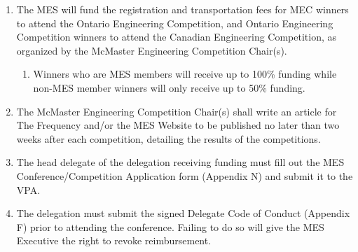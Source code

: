 \begin{enumerate}
  \begin{enumerate}
   \item
    The MES will fund the registration and transportation fees for MEC winners to attend the Ontario Engineering Competition, and Ontario Engineering Competition winners to attend the Canadian Engineering Competition, as organized by the McMaster Engineering Competition Chair(s).

    \begin{enumerate}
     \item
      Winners who are MES members will receive up to 100\% funding while non-MES member winners will only receive up to 50\% funding.
    \end{enumerate}
   \item
    The McMaster Engineering Competition Chair(s) shall write an article for The Frequency and/or the MES Website to be published no later than two weeks after each competition, detailing the results of the competitions.
   \item
    The head delegate of the delegation receiving funding must fill out the MES Conference/Competition Application form (Appendix N) and submit it to the VPA.
   \item
    The delegation must submit the signed Delegate Code of Conduct (Appendix F) prior to attending the conference. Failing to do so will give the MES Executive the right to revoke reimbursement.

  \end{enumerate}
\end{enumerate}


